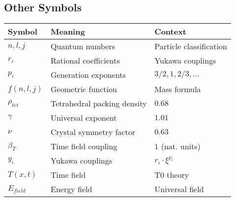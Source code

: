 \documentclass[12pt,a4paper]{article}
\begin{document}
\subsection{Other Symbols}
\begin{longtable}{lll}
	\toprule
	\textbf{Symbol} & \textbf{Meaning} & \textbf{Context} \\
	\midrule
	$n, l, j$ & Quantum numbers & Particle classification \\
	$r_i$ & Rational coefficients & Yukawa couplings \\
	$p_i$ & Generation exponents & $3/2, 1, 2/3, ...$ \\
	$f(n,l,j)$ & Geometric function & Mass formula \\
	$\rho_{tet}$ & Tetrahedral packing density & $0.68$ \\
	$\gamma$ & Universal exponent & $1.01$ \\
	$\nu$ & Crystal symmetry factor & $0.63$ \\
	$\beta_T$ & Time field coupling & $1$ (nat. units) \\
	$y_i$ & Yukawa couplings & $r_i \cdot \xi^{p_i}$ \\
	$T(x,t)$ & Time field & T0 theory \\
	$E_{field}$ & Energy field & Universal field \\
	\bottomrule
\end{longtable}	
\appendix
\end{document}
